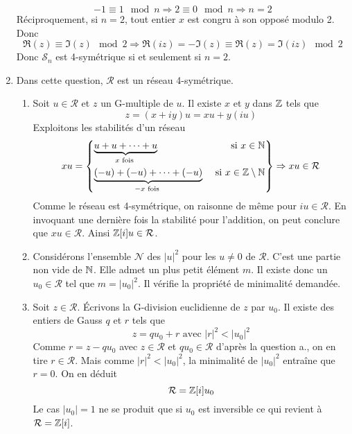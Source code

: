 \begin{enumerate}
\begin{displaymath}
  -1 \equiv 1 \mod n \Rightarrow 2 \equiv 0 \mod n \Rightarrow n=2
\end{displaymath}
Réciproquement, si $n=2$, tout entier $x$ est congru à son opposé modulo 2. Donc 
\begin{displaymath}
  \Re(z)\equiv \Im(z) \mod 2 \Rightarrow \Re(iz) = -\Im(z) \equiv \Re(z) = \Im(iz) \mod 2
\end{displaymath}
Donc $\mathcal{S}_n$ est 4-symétrique si et seulement si $n=2$.
\item Dans cette question, $\mathcal{R}$ est un réseau 4-symétrique.
\begin{enumerate}
  \item Soit $u\in \mathcal{R}$ et $z$ un G-multiple de $u$. Il existe $x$ et $y$ dans $\mathbb{Z}$ tels que 
\begin{displaymath}
  z = (x+iy)u = xu + y(iu)
\end{displaymath}
Exploitons les stabilités d'un réseau
\begin{displaymath}
xu =
\left\lbrace 
\begin{aligned}
  &\underset{x \text{ fois }}{ \underbrace{u + u + \cdots +u}} &\text{ si } x\in \mathbb{N} \\
  &\underset{-x \text{ fois }}{\underbrace{ (-u) + (-u) + \cdots + (-u)}} &\text{ si } x\in \mathbb{Z}\setminus \mathbb{N} 
\end{aligned}
\right\rbrace
\Rightarrow xu \in \mathcal{R}
\end{displaymath}
Comme le réseau est 4-symétrique, on raisonne de même pour $iu\in \mathcal{R}$. En invoquant une dernière fois la stabilité pour l'addition, on peut conclure que $xu\in \mathcal{R}$. Ainsi $\mathbb{Z}[i]u\in \mathcal{R}$.
  \item Considérons l'ensemble $\mathcal{N}$ des $|u|^2$ pour les $u\neq 0$ de $\mathcal{R}$. C'est une partie non vide de $\mathbb{N}$. Elle admet un plus petit élément $m$. Il existe donc un $u_0\in \mathcal{R}$ tel que $m=|u_0|^2$. Il vérifie la propriété de minimalité demandée.
  \item Soit $z\in \mathcal{R}$. \'Ecrivons la G-division euclidienne de $z$ par $u_0$. Il existe des entiers de Gauss $q$ et $r$ tels que 
\begin{displaymath}
  z = qu_0 + r\text{ avec } |r|^2 < |u_0|^2
\end{displaymath}
Comme $r = z -qu_0$ avec $z\in \mathcal{R}$ et $qu_0\in \mathcal{R}$ d'après la question a., on en tire $r\in \mathcal{R}$. Mais comme $|r|^2 < |u_0|^2$, la minimalité de $|u_0|^2$ entraîne que $r=0$. On en déduit
\begin{displaymath}
  \mathcal{R} = \mathbb{Z}[i]u_0
\end{displaymath}
Le cas $|u_0|=1$ ne se produit que si $u_0$ est inversible ce qui revient à $\mathcal{R} = \mathbb{Z}[i]$.
\end{enumerate}

\end{enumerate}

